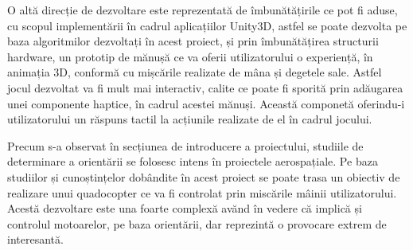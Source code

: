 \-\hspace{1cm}O altă direcție de dezvoltare este reprezentată de îmbunătățirile ce pot fi aduse, cu scopul implementării în cadrul aplicațiilor Unity3D, astfel se poate dezvolta pe baza algoritmilor dezvoltați în acest proiect, și prin îmbunătățirea structurii hardware, un prototip de mănușă ce va oferii utilizatorului o experiență, în animația 3D, conformă cu mișcările realizate de mâna și degetele sale. Astfel jocul dezvoltat va fi mult mai interactiv, calite ce poate fi sporită prin adăugarea unei componente haptice, în cadrul acestei mănuși. Această componetă oferindu-i utilizatorului un răspuns tactil la acțiunile realizate de el în cadrul jocului.

\-\hspace{1cm}Precum s-a observat în secțiunea de introducere a proiectului, studiile de determinare a orientării se folosesc intens în proiectele aerospațiale. Pe baza studiilor și cunoștințelor dobândite în acest proiect se poate trasa un obiectiv de realizare unui quadocopter ce va fi controlat prin miscările mâinii utilizatorului. Acestă dezvoltare este una foarte complexă avănd în vedere că implică și controlul motoarelor, pe baza orientării, dar reprezintă o provocare extrem de interesantă.
